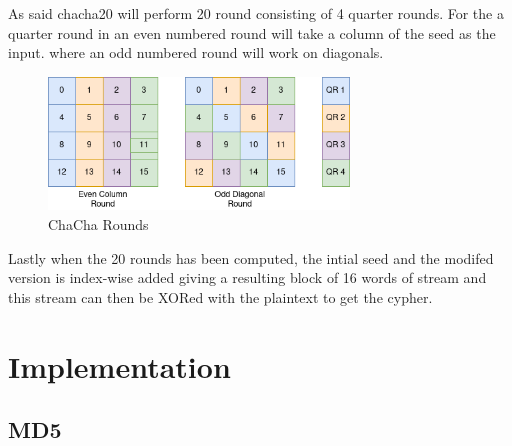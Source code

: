 \documentclass[a4paper]{article}
\begin{document}
As said chacha20 will perform 20 round consisting of 4 quarter rounds. For the a quarter round in an even numbered round will take a column of the seed as the input. where an odd numbered round will work on diagonals.
\begin{figure}[!htb]
\centering
\includegraphics[width=8cm]{Background/diagonal.png}
\caption{ChaCha Rounds}
\label{fig:ChaChaRound}
\end{figure}
Lastly when the 20 rounds has been computed, the intial seed and the modifed version is index-wise added giving a resulting block of 16 words of stream and this stream can then be XORed with the plaintext to get the cypher.

\section{Implementation}
\label{sec:org7f0df2f}
\subsection{MD5}
\label{sec:org5e93803}
\end{document}

